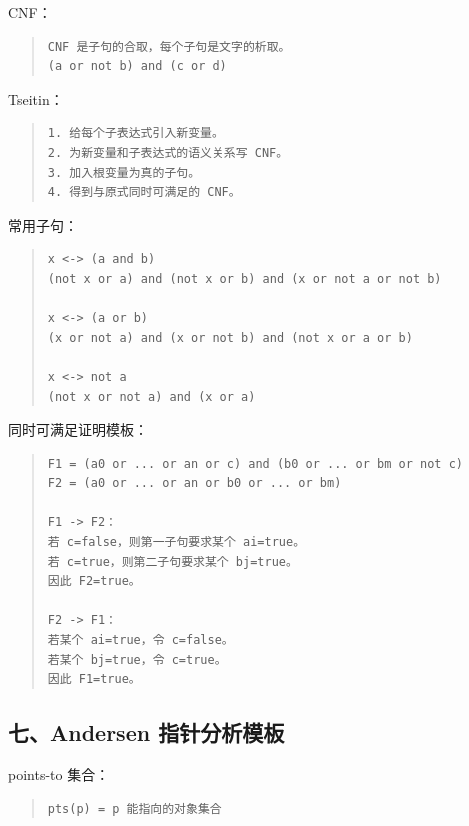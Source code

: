 \documentclass[UTF8,zihao=-4]{ctexart}
\begin{document}
CNF：


\begin{quote}
\footnotesize
\begin{verbatim}
CNF 是子句的合取，每个子句是文字的析取。
(a or not b) and (c or d)
\end{verbatim}
\end{quote}


Tseitin：


\begin{quote}
\footnotesize
\begin{verbatim}
1. 给每个子表达式引入新变量。
2. 为新变量和子表达式的语义关系写 CNF。
3. 加入根变量为真的子句。
4. 得到与原式同时可满足的 CNF。
\end{verbatim}
\end{quote}


常用子句：


\begin{quote}
\footnotesize
\begin{verbatim}
x <-> (a and b)
(not x or a) and (not x or b) and (x or not a or not b)

x <-> (a or b)
(x or not a) and (x or not b) and (not x or a or b)

x <-> not a
(not x or not a) and (x or a)
\end{verbatim}
\end{quote}


同时可满足证明模板：


\begin{quote}
\footnotesize
\begin{verbatim}
F1 = (a0 or ... or an or c) and (b0 or ... or bm or not c)
F2 = (a0 or ... or an or b0 or ... or bm)

F1 -> F2：
若 c=false，则第一子句要求某个 ai=true。
若 c=true，则第二子句要求某个 bj=true。
因此 F2=true。

F2 -> F1：
若某个 ai=true，令 c=false。
若某个 bj=true，令 c=true。
因此 F1=true。
\end{verbatim}
\end{quote}


\subsection{七、Andersen 指针分析模板}


points-to 集合：


\begin{quote}
\footnotesize
\begin{verbatim}
pts(p) = p 能指向的对象集合
\end{verbatim}
\end{quote}
\end{document}
